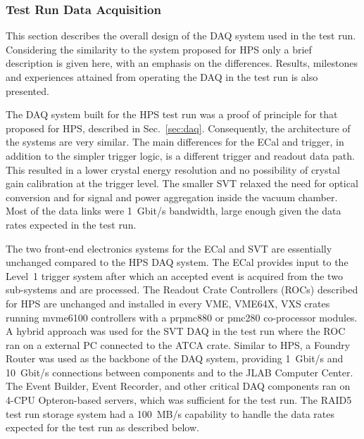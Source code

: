 
\subsubsection{Test Run Data Acquisition}
\label{sec:testrun_daq}
This section describes the overall design of the DAQ system used in the test run. 
Considering the similarity to the 
system proposed for HPS only a brief description is given here, with an emphasis on the differences. 
Results, milestones and experiences attained from operating the DAQ in the test run is also presented. 

The DAQ system built for the HPS test run was a proof of principle for that proposed for HPS, described in 
Sec.~\ref{sec:daq}. Consequently, the architecture of the systems are very similar. The main differences 
for the ECal and trigger, in addition to the simpler trigger logic, is a different trigger and readout data 
path. This resulted in a lower crystal energy resolution and no possibility of crystal gain calibration at the 
trigger level. The smaller SVT relaxed the need for optical conversion and for signal and power aggregation 
inside the vacuum chamber. 
Most of the data links were 1~Gbit/s bandwidth, large enough given the data rates expected in the test run.



The two front-end electronics systems for the ECal and SVT are essentially unchanged compared to the HPS 
DAQ system. The ECal provides 
input to the Level~1 trigger system after which an accepted event is acquired from the two sub-systems 
and are processed. The Readout Crate Controllers (ROCs)
 described for HPS are unchanged and installed in every VME, VME64X, VXS crates running 
 mvme6100 controllers with a prpmc880 or pmc280 co-processor modules. A hybrid approach was 
 used for the SVT DAQ in the test run where the ROC ran on a external PC connected to the ATCA crate. 
 Similar to HPS, a Foundry Router was used as the backbone of the DAQ system, providing 1~Gbit/s and 
 10~Gbit/s connections between components and to the JLAB Computer Center. The Event Builder, Event 
 Recorder, and other critical DAQ components ran on 4-CPU Opteron-based servers, which was sufficient 
 for the test run. The RAID5 test run storage system had a 100~MB/s capability to handle the data rates 
 expected for the test run as described below.






